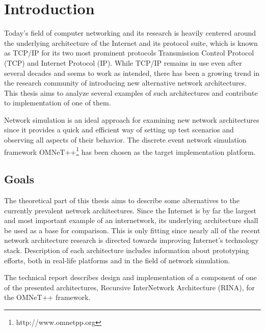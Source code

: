 

\chapter{Introduction}\label{intro}

    Today's field of computer networking and its research is heavily centered around the underlying architecture of the Internet and its protocol suite, which is known as TCP/IP for its two most prominent protocols Transmission Control Protocol (TCP) and Internet Protocol (IP). While TCP/IP remains in use even after several decades and seems to work as intended, there has been a growing trend in the research community of introducing new alternative network architectures. This thesis aims to analyze several examples of such architectures and contribute to implementation of one of them.

    Network simulation is an ideal approach for examining new network architectures since it provides a quick and efficient way of setting up test scenarios and observing all aspects of their behavior. The discrete event network simulation framework OMNeT++\footnote{http://www.omnetpp.org} has been chosen as the target implementation platform.

    \section{Goals}

        The theoretical part of this thesis aims to describe some alternatives to the currently prevalent network architectures. Since the Internet is by far the largest and most important example of an internetwork, its underlying architecture shall be used as a base for comparison. This is only fitting since nearly all of the recent network architecture research is directed towards improving Internet's technology stack. Description of each architecture includes information about prototyping efforts, both in real-life platforms and in the field of network simulation.

        The technical report describes design and implementation of a component of one of the presented architectures, Recursive InterNetwork Architecture (RINA), for the OMNeT++ framework.

